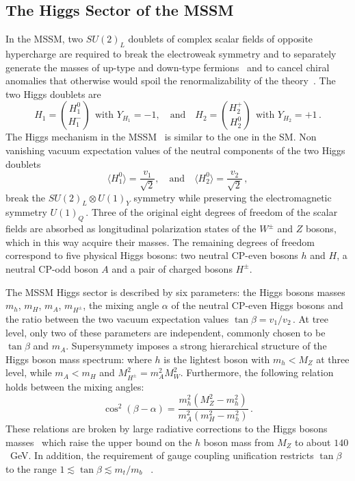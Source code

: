 

\subsection{The Higgs Sector of the MSSM }\label{sec:hsector}
In the MSSM, two $SU(2)_L$ doublets of complex scalar fields of opposite hypercharge are required to break the electroweak symmetry
and  
to separately generate the masses of up-type and down-type fermions~\cite{Susy2,Higgsm1,Higgsm2}
and to cancel chiral anomalies that otherwise would spoil the renormalizability of the theory~\cite{Higgsm3}. The two Higgs doublets  are
\begin{equation}
H_1 = \binom{H_1^0}{H_1^-} ~ ~ \text{with } Y_{H_1} = -1, \quad \text{and} \quad H_2 = \binom{H_2^+}{H_2^0} ~ ~ \text{with } Y_{H_2} = +1 \,. 
\end{equation}
The Higgs mechanism in the MSSM~\cite{MSSM1,Higgsm4} is similar to the one in the SM.
Non vanishing vacuum expectation values of the neutral components of the two Higgs doublets
\begin{equation}
\langle H_1^0 \rangle = \frac{v_1}{\sqrt{2}}, \quad \text{and} \quad  \langle H_2^0 \rangle = \frac{v_2}{\sqrt{2}}\,,
\end{equation}
break the $SU(2)_L \otimes U(1)_Y$ symmetry while preserving the electromagnetic symmetry $U(1)_Q\,$.
Three of the original eight degrees of freedom of the scalar fields are absorbed as longitudinal polarization states of 
the $W^{\pm}$ and $Z$ bosons, which in this way acquire their masses. 
The remaining degrees of freedom correspond to five physical Higgs bosons: two neutral CP-even 
bosons $h$ and $H$, 
a neutral CP-odd boson $A$ and a pair of charged bosons $H^{\pm}$. 

The MSSM Higgs sector is described by six parameters: the Higgs bosons masses $m_h$, $m_H$, $m_A$, $m_{H^\pm}$,
the mixing angle $\alpha$ of the neutral CP-even Higgs bosons  and the ratio between the two vacuum expectation values $\tan \beta = v_1/v_2\,$.
At tree level,  only two of these parameters  are  independent, commonly chosen to be  $\tan \beta$ and $m_A$. 
Supersymmety imposes a strong hierarchical structure of the Higgs boson mass spectrum:  
where $h$ is the lightest boson with $m_h < M_Z$ at three level, while  $m_A < m_H$  and $M_{H^\pm}^2 = m_A^2 M_W^2$. Furthermore, the 
following relation holds between the mixing angles:
\begin{equation}\label{eq:mixing}
\cos^2(\beta - \alpha) = \frac{m_h^2 (M_Z^2 - m_h^2)}{m_A^2 (m_H^2 - m_h^2)} \,.
\end{equation}
These relations are broken by large radiative corrections to the Higgs bosons 
masses~\cite{Higgsm5} which raise the upper bound on the  $h$ boson mass from  $M_Z$ to about $140$~GeV.
In addition, the requirement of gauge coupling unification restricts $\tan\beta$ to the range  $1 \apprle \tan \beta \apprle m_t/m_b$ ~\cite{Higgsm6}.


